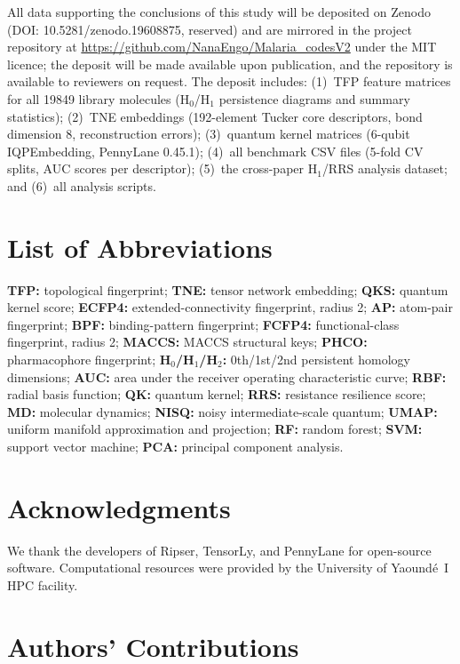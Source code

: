\documentclass[11pt,a4paper]{article}
\begin{document}
All data supporting the conclusions of this study will be deposited on Zenodo (DOI: 10.5281/zenodo.19608875, reserved) and are mirrored in the project repository at \url{https://github.com/NanaEngo/Malaria_codesV2} under the MIT licence; the deposit will be made available upon publication, and the repository is available to reviewers on request. The deposit includes: (1)~TFP feature matrices for all \num{19849} library molecules (H$_0$/H$_1$ persistence diagrams and summary statistics); (2)~TNE embeddings (\num{192}-element Tucker core descriptors, bond dimension 8, reconstruction errors); (3)~quantum kernel matrices (6-qubit IQPEmbedding, PennyLane 0.45.1); (4)~all benchmark CSV files (5-fold CV splits, AUC scores per descriptor); (5)~the cross-paper H$_1$/RRS analysis dataset; and (6)~all analysis scripts.

\section*{List of Abbreviations}

\textbf{TFP:} topological fingerprint; \textbf{TNE:} tensor network embedding; \textbf{QKS:} quantum kernel score; \textbf{ECFP4:} extended-connectivity fingerprint, radius 2; \textbf{AP:} atom-pair fingerprint; \textbf{BPF:} binding-pattern fingerprint; \textbf{FCFP4:} functional-class fingerprint, radius 2; \textbf{MACCS:} MACCS structural keys; \textbf{PHCO:} pharmacophore fingerprint; \textbf{H$_0$/H$_1$/H$_2$:} 0th/1st/2nd persistent homology dimensions; \textbf{AUC:} area under the receiver operating characteristic curve; \textbf{RBF:} radial basis function; \textbf{QK:} quantum kernel; \textbf{RRS:} resistance resilience score; \textbf{MD:} molecular dynamics; \textbf{NISQ:} noisy intermediate-scale quantum; \textbf{UMAP:} uniform manifold approximation and projection; \textbf{RF:} random forest; \textbf{SVM:} support vector machine; \textbf{PCA:} principal component analysis.

\section*{Acknowledgments}

We thank the developers of Ripser, TensorLy, and PennyLane for open-source software. Computational resources were provided by the University of Yaound\'{e}~I HPC facility.

\section*{Authors' Contributions}
\end{document}
